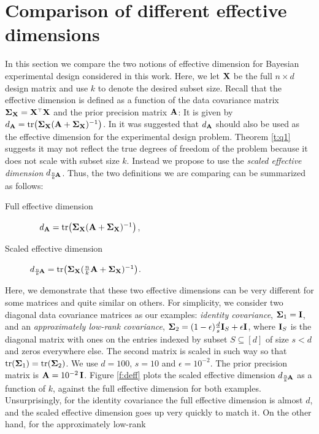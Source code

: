 \documentclass[11pt]{article}
\begin{document}
\section{Comparison of different effective dimensions}
\label{a:deff}
In this section we compare the two notions of effective dimension for
Bayesian experimental design considered in this work. Here, we let
$\mathbf X$ be the full $n\times d$ design matrix and use $k$ to denote the
desired subset size. Recall that the effective dimension is  defined
as a function of the data covariance matrix $\Sigmab_\X=\X^\top\X$ and
the prior precision matrix $\mathbf A$:
It is given by $d_{\mathbf A} =
\mathrm{tr}\big(\mathbf{\Sigma}_\mathbf X(\mathbf A+\mathbf{\Sigma}_\mathbf X)^{-1}\big)$. In
\cite{regularized-volume-sampling} it was suggested that $d_{\mathbf A}$
should also be used as the effective dimension for the experimental
design problem. Theorem \ref{t:q1} suggests it may not reflect the true degrees
of freedom of the problem because it does not scale with subset size
$k$. Instead we propose to use the \emph{scaled effective dimension}
$d_{\frac nk\!\mathbf A}$. Thus, the two definitions we are comparing can be
summarized as follows:
\begin{description}
  \item[Full effective dimension]\quad\ \ \,$d_{\mathbf A} =
    \mathrm{tr}\big(\mathbf{\Sigma}_\mathbf X(\mathbf A+\mathbf{\Sigma}_\mathbf X)^{-1}\big)$,
    \item[Scaled effective dimension] $d_{\frac nk\!\mathbf A} =
      \mathrm{tr}\big(\mathbf{\Sigma}_\mathbf X(\tfrac nk\mathbf A + \mathbf{\Sigma}_\mathbf X)^{-1}\big)$.
    \end{description}
    Here, we demonstrate that these two effective dimensions can be
    very different for some matrices and quite similar on others. For
    simplicity, we consider two diagonal data covariance matrices as
    our examples: \emph{identity covariance}, $\mathbf{\Sigma}_1 = \mathbf I$, and an
    \emph{approximately low-rank covariance}, $\mathbf{\Sigma}_2 =
    (1-\epsilon)\frac ds \mathbf I_S+\epsilon\mathbf I$, where $\mathbf I_S$ is the
    diagonal matrix with ones on the entries indexed by subset
    $S\subseteq [d]$ of
    size $s<d$ and zeros
    everywhere else. The second matrix is scaled in such way so that
    $\mathrm{tr}(\mathbf{\Sigma}_1)=\mathrm{tr}(\mathbf{\Sigma}_2)$. We use $d=100$, $s=10$ and
    $\epsilon=10^{-2}$. The prior precision matrix is
    $\mathbf A=10^{-2}\,\mathbf I$. Figure \ref{f:deff} plots the scaled effective
    dimension $d_{\frac nk\!\mathbf A}$ as a function of $k$, against the
    full effective dimension for both examples. Unsurprisingly, for
    the identity covariance the full effective dimension is almost
    $d$, and the scaled effective dimension goes up very quickly to
    match it. On the other hand, for the approximately low-rank
\end{document}
